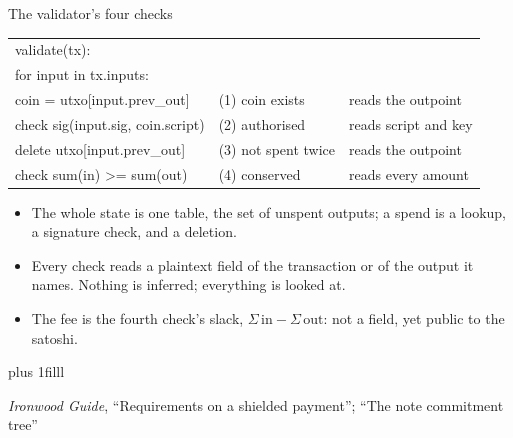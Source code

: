 \documentclass[aspectratio=169,11pt]{beamer}
\newcommand{\src}[1]{\par\vskip0pt plus 1filll
  {\fontsize{6}{7.2}\selectfont\color{arbdim}\raggedright #1\par}}
\begin{document}
\begin{frame}{The validator's four checks}
{\ttfamily\small
\begin{tabular}{@{}l@{\quad}l@{\quad}l@{}}
validate(tx): & & \\
\quad for input in tx.inputs: & & \\
\quad\quad coin = utxo[input.prev\_out]
  & \normalfont (1) coin exists & \normalfont reads the outpoint \\
\quad\quad check sig(input.sig, coin.script)
  & \normalfont (2) authorised & \normalfont reads script and key \\
\quad\quad delete utxo[input.prev\_out]
  & \normalfont (3) not spent twice & \normalfont reads the outpoint \\
\quad check sum(in) >= sum(out)
  & \normalfont (4) conserved & \normalfont reads every amount \\
\end{tabular}}
\medskip
\begin{itemize}
  \item The whole state is one table, the set of unspent outputs; a spend
    is a lookup, a signature check, and a deletion.
  \item Every check reads a plaintext field of the transaction or of the
    output it names. Nothing is inferred; everything is looked at.
  \item The fee is the fourth check's slack, $\Sigma\,\mathrm{in} -
    \Sigma\,\mathrm{out}$: not a field, yet public to the satoshi.
\end{itemize}
\src{\emph{Ironwood Guide}, ``Requirements on a shielded payment'';
  ``The note commitment tree''}
\end{frame}
\end{document}
